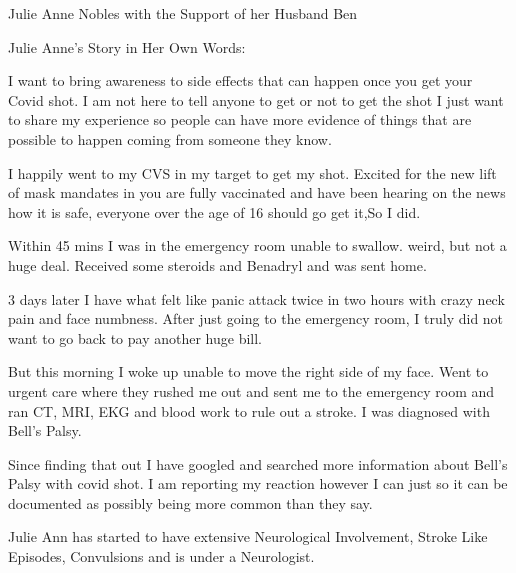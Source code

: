 Julie Anne Nobles with the Support of her Husband Ben

Julie Anne’s Story in Her Own Words:

I want to bring awareness to side effects that can happen once you get your
Covid shot. I am not here to tell anyone to get or not to get the shot I just
want to share my experience so people can have more evidence of things that are
possible to happen coming from someone they know.

I happily went to my CVS in my target to get my shot. Excited for the new lift
of mask mandates in you are fully vaccinated and have been hearing on the news
how it is safe, everyone over the age of 16 should go get it,So I did.

Within 45 mins I was in the emergency room unable to swallow. weird, but not a
huge deal. Received some steroids and Benadryl and was sent home.

3 days later I have what felt like panic attack twice in two hours with crazy
neck pain and face numbness. After just going to the emergency room, I truly did
not want to go back to pay another huge bill.

But this morning I woke up unable to move the right side of my face. Went to
urgent care where they rushed me out and sent me to the emergency room and ran
CT, MRI, EKG and blood work to rule out a stroke. I was diagnosed with Bell’s
Palsy.

Since finding that out I have googled and searched more information about Bell’s
Palsy with covid shot. I am reporting my reaction however I can just so it can
be documented as possibly being more common than they say.

Julie Ann has started to have extensive Neurological Involvement, Stroke Like
Episodes, Convulsions and is under a Neurologist.


